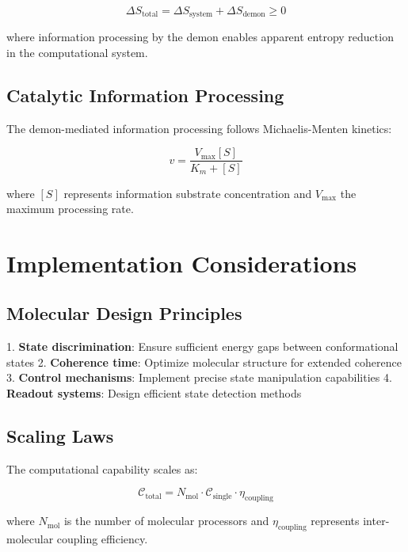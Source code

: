 \documentclass[12pt]{article}
\begin{document}
\begin{equation}
\Delta S_{\text{total}} = \Delta S_{\text{system}} + \Delta S_{\text{demon}} \geq 0
\end{equation}

where information processing by the demon enables apparent entropy reduction in the computational system.

\subsection{Catalytic Information Processing}

The demon-mediated information processing follows Michaelis-Menten kinetics:

\begin{equation}
v = \frac{V_{\text{max}}[S]}{K_m + [S]}
\end{equation}

where $[S]$ represents information substrate concentration and $V_{\text{max}}$ the maximum processing rate.

\section{Implementation Considerations}

\subsection{Molecular Design Principles}

1. \textbf{State discrimination}: Ensure sufficient energy gaps between conformational states
2. \textbf{Coherence time}: Optimize molecular structure for extended coherence
3. \textbf{Control mechanisms}: Implement precise state manipulation capabilities
4. \textbf{Readout systems}: Design efficient state detection methods

\subsection{Scaling Laws}

The computational capability scales as:

\begin{equation}
\mathcal{C}_{\text{total}} = N_{\text{mol}} \cdot \mathcal{C}_{\text{single}} \cdot \eta_{\text{coupling}}
\end{equation}

where $N_{\text{mol}}$ is the number of molecular processors and $\eta_{\text{coupling}}$ represents inter-molecular coupling efficiency.
\end{document}
